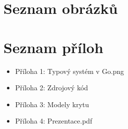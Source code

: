 \documentclass[czech,12pt,a4paper]{article}
\begin{document}
\section{Seznam obrázků}

\vspace*{-1.5cm}
\listoffigures

\section{Seznam příloh}

\begin{itemize}
	\item Příloha 1: Typový systém v Go.png
	\item Příloha 2: Zdrojový kód
	\item Příloha 3: Modely krytu
	\item Příloha 4: Prezentace.pdf
\end{itemize}
\end{document}
